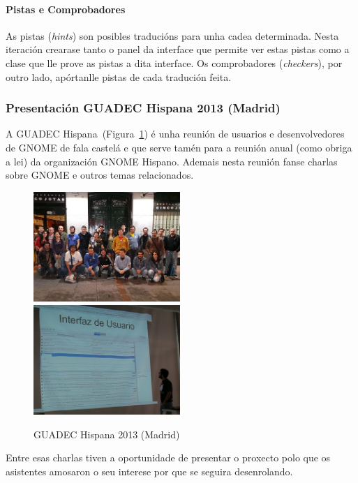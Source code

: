 \paragraph{Pistas e Comprobadores} As pistas (\emph{hints}) son posibles traducións para unha cadea determinada. Nesta iteración crearase tanto o panel da interface que permite ver estas pistas como a clase que lle prove as pistas a dita interface. Os comprobadores (\emph{checkers}), por outro lado, apórtanlle pistas de cada tradución feita.

\subsubsection{Presentación GUADEC Hispana 2013 (Madrid)}

A GUADEC Hispana~(Figura~\ref{fig:guadec-es-2013}) é unha reunión de usuarios e desenvolvedores de GNOME de fala castelá e que serve tamén para a reunión anual (como obriga a lei) da organización GNOME Hispano. Ademais nesta reunión fanse charlas sobre GNOME e outros temas relacionados.

\begin{figure}[h!]
    \centering
    \includegraphics[width=0.495\textwidth]{img/guadec_es_2013_1.jpg}
    \includegraphics[width=0.495\textwidth]{img/guadec_es_2013_2.jpg}
    \caption{GUADEC Hispana 2013 (Madrid)}
    \label{fig:guadec-es-2013}
\end{figure}

Entre esas charlas tiven a oportunidade de presentar o proxecto polo que os asistentes amosaron o seu interese por que se seguira desenrolando.

